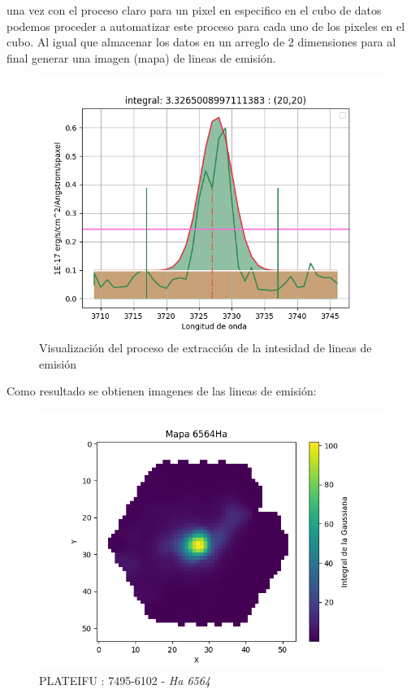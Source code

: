 \documentclass[9pt,twocolumn,a4paper]{opticajnl}
\begin{document}
una vez con el proceso claro para un pixel en especifico en el cubo de datos podemos proceder a automatizar este proceso para cada uno de los pixeles en el cubo. Al igual que almacenar los datos en un arreglo de 2 dimensiones para al final generar una imagen (mapa) de lineas de emisión.

\begin{figure}
    \centering
    \includegraphics[width=1\linewidth]{extraccion_linea.png}
    \caption{Visualización del proceso de extracción de la intesidad de lineas de emisión}
    \label{fig:extraccion_linea.}
\end{figure}
Como resultado se obtienen imagenes de las lineas de emisión:

\begin{figure}
    \centering
    \includegraphics[width=1\linewidth]{img7495-6102_Ha_6564_.png}
    \caption{PLATEIFU : 7495-6102 - \textit{Ha 6564}}
    \label{fig:moreinfo}
\end{figure}
\end{document}
